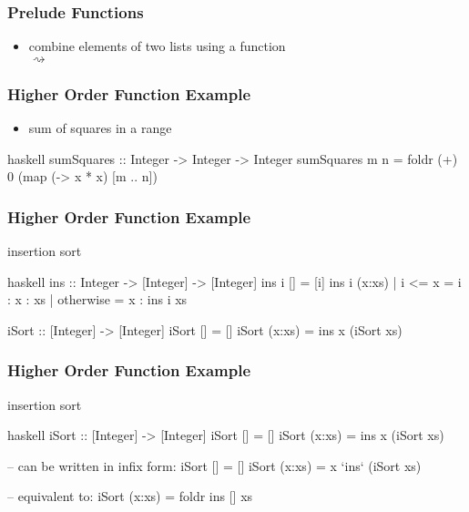 \documentclass[dvipsnames]{beamer}
\theoremstyle{plain}
\begin{document}
\begin{frame}[fragile]
  \frametitle{Prelude Functions}

  \begin{itemize}
    \item combine elements of two lists using a function\\
       $\rightsquigarrow$
  \end{itemize}

  \begin{exampleblock}{}
  \end{exampleblock}
\end{frame}

\begin{frame}[fragile]
  \frametitle{Higher Order Function Example}

  \begin{itemize}
    \item sum of squares in a range
  \end{itemize}

  \begin{exampleblock}{}
    \begin{pygments}{haskell}
sumSquares :: Integer -> Integer -> Integer
sumSquares m n =
    foldr (+) 0 (map (\x -> x * x) [m .. n])
    \end{pygments}
  \end{exampleblock}
\end{frame}

\begin{frame}[fragile]
  \frametitle{Higher Order Function Example}

  \begin{exampleblock}{insertion sort}
    \begin{pygments}{haskell}
ins :: Integer -> [Integer] -> [Integer]
ins i []      = [i]
ins i (x:xs)
  | i <= x    = i : x : xs
  | otherwise = x : ins i xs

iSort :: [Integer] -> [Integer]
iSort []     = []
iSort (x:xs) = ins x (iSort xs)
    \end{pygments}
  \end{exampleblock}
\end{frame}

\begin{frame}[fragile]
  \frametitle{Higher Order Function Example}

  \begin{exampleblock}{insertion sort}
    \begin{pygments}{haskell}
iSort :: [Integer] -> [Integer]
iSort []     = []
iSort (x:xs) = ins x (iSort xs)

-- can be written in infix form:
iSort []     = []
iSort (x:xs) = x `ins` (iSort xs)

-- equivalent to:
iSort (x:xs) = foldr ins [] xs
    \end{pygments}
  \end{exampleblock}
\end{frame}
\end{document}
